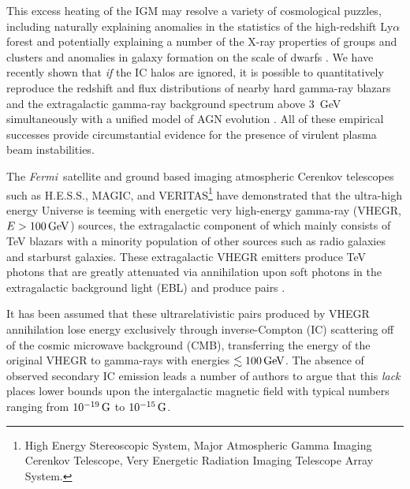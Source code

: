 \documentclass[usenatbib,iop,apj]{emulateapj}
\def\eV{{\rm eV}} %
\def\GeV{{\rm G}\eV} %
\def\G{{\rm G}}
\def\Fermi{{\em Fermi\ }}
\begin{document}
This excess heating of the IGM may resolve a variety
of cosmological puzzles, including naturally explaining
  anomalies in the statistics of the high-redshift Ly$\alpha$ forest
\citep{paperIV} and potentially explaining a number of the X-ray
  properties of groups and clusters and anomalies in galaxy formation on
  the scale of dwarfs \citep{paperIII,Lu+2013}.  We
  have recently shown that \textit{if} the IC halos are ignored, it is possible
  to quantitatively reproduce the redshift and flux distributions
  of nearby hard gamma-ray blazars and the extragalactic gamma-ray background
  spectrum above 3~GeV simultaneously with a unified model of AGN evolution
  \citep{Broderick+2013,Broderick+2013b}.  All of these empirical successes provide
  circumstantial evidence for the presence of virulent plasma beam
  instabilities. 



The \Fermi satellite and ground based imaging atmospheric Cerenkov telescopes such as
H.E.S.S., MAGIC, and VERITAS\footnote{High Energy
  Stereoscopic System, Major Atmospheric Gamma Imaging Cerenkov Telescope, Very
  Energetic Radiation Imaging Telescope Array System.} have demonstrated that the ultra-high
energy Universe is teeming with energetic very high-energy gamma-ray 
(VHEGR, $E > 100\,\GeV$) sources, the extragalactic component of which mainly consists of TeV
blazars with a minority population of other sources  such as radio galaxies
and starburst galaxies. These extragalactic VHEGR emitters produce TeV photons that are greatly attenuated via annihilation upon soft photons in the extragalactic background light
(EBL) and produce pairs \citep[see, e.g.,][]{Goul-Schr:67,Sala-Stec:98,Nero-Semi:09}.

It has been assumed that these ultrarelativistic pairs produced by VHEGR annihilation 
lose energy exclusively through inverse-Compton (IC) scattering off of the cosmic microwave
background (CMB),   transferring the energy of the original VHEGR to gamma-rays with
energies $\lesssim100\,\GeV$.  The absence of observed secondary IC emission leads a number of
authors to argue that this \textit{lack} places lower bounds upon the
intergalactic magnetic field
\citep[IGMF; see, e.g.,][]{Nero-Vovk:10,Tave_etal:10a,Tave_etal:10b,Derm_etal:10,Tayl-Vovk-Nero:11,Taka_etal:11,Dola_etal:11} with 
typical numbers ranging from $10^{-19}\,\G$ to $10^{-15}\,\G$.  
\end{document}
